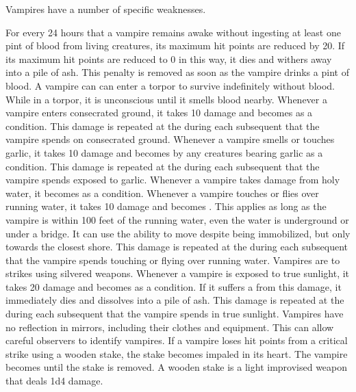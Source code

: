   Vampires have a number of specific weaknesses.
  \begin{itemize}
     For every 24 hours that a vampire remains awake without ingesting at least one pint of blood from living creatures, its maximum hit points are reduced by 20.
      If its maximum hit points are reduced to 0 in this way, it dies and withers away into a pile of ash.
      This penalty is removed as soon as the vampire drinks a pint of blood.
      A vampire can can enter a torpor to survive indefinitely without blood.
      While in a torpor, it is unconscious until it smells blood nearby.
     Whenever a vampire enters consecrated ground, it takes 10 damage and becomes \stunned as a condition.
      This damage is repeated at the during each subsequent  that the vampire spends on consecrated ground.
     Whenever a vampire smells or touches garlic, it takes 10 damage and becomes \frightened by any creatures bearing garlic as a condition.
      This damage is repeated at the during each subsequent  that the vampire spends exposed to garlic.
     Whenever a vampire takes damage from holy water, it becomes \stunned as a condition.
     Whenever a vampire touches or flies over running water, it takes 10 damage and  becomes \immobilized.
      This applies as long as the vampire is within 100 feet of the running water, even the water is underground or under a bridge.
      It can use the  ability to move despite being immobilized, but only towards the closest shore.
      This damage is repeated at the during each subsequent  that the vampire spends touching or flying over running water.
     Vampires are \vulnerable to strikes using silvered weapons.
     Whenever a vampire is exposed to true sunlight, it takes 20 damage and becomes \blinded as a condition.
      If it suffers a  from this damage, it immediately dies and dissolves into a pile of ash.
      This damage is repeated at the during each subsequent  that the vampire spends in true sunlight.
     Vampires have no reflection in mirrors, including their clothes and equipment.
      This can allow careful observers to identify vampires.
     If a vampire loses hit points from a critical strike using a wooden stake, the stake becomes impaled in its heart.
      The vampire becomes \paralyzed until the stake is removed.
      A wooden stake is a light improvised weapon that deals 1d4 damage.
  \end{itemize}

